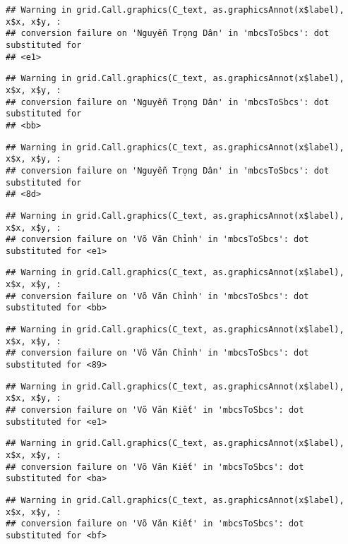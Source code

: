 \documentclass[
]{article}
\begin{document}
\begin{verbatim}
## Warning in grid.Call.graphics(C_text, as.graphicsAnnot(x$label), x$x, x$y, :
## conversion failure on 'Nguyễn Trọng Dân' in 'mbcsToSbcs': dot substituted for
## <e1>
\end{verbatim}

\begin{verbatim}
## Warning in grid.Call.graphics(C_text, as.graphicsAnnot(x$label), x$x, x$y, :
## conversion failure on 'Nguyễn Trọng Dân' in 'mbcsToSbcs': dot substituted for
## <bb>
\end{verbatim}

\begin{verbatim}
## Warning in grid.Call.graphics(C_text, as.graphicsAnnot(x$label), x$x, x$y, :
## conversion failure on 'Nguyễn Trọng Dân' in 'mbcsToSbcs': dot substituted for
## <8d>
\end{verbatim}

\begin{verbatim}
## Warning in grid.Call.graphics(C_text, as.graphicsAnnot(x$label), x$x, x$y, :
## conversion failure on 'Võ Văn Chỉnh' in 'mbcsToSbcs': dot substituted for <e1>
\end{verbatim}

\begin{verbatim}
## Warning in grid.Call.graphics(C_text, as.graphicsAnnot(x$label), x$x, x$y, :
## conversion failure on 'Võ Văn Chỉnh' in 'mbcsToSbcs': dot substituted for <bb>
\end{verbatim}

\begin{verbatim}
## Warning in grid.Call.graphics(C_text, as.graphicsAnnot(x$label), x$x, x$y, :
## conversion failure on 'Võ Văn Chỉnh' in 'mbcsToSbcs': dot substituted for <89>
\end{verbatim}

\begin{verbatim}
## Warning in grid.Call.graphics(C_text, as.graphicsAnnot(x$label), x$x, x$y, :
## conversion failure on 'Võ Văn Kiết' in 'mbcsToSbcs': dot substituted for <e1>
\end{verbatim}

\begin{verbatim}
## Warning in grid.Call.graphics(C_text, as.graphicsAnnot(x$label), x$x, x$y, :
## conversion failure on 'Võ Văn Kiết' in 'mbcsToSbcs': dot substituted for <ba>
\end{verbatim}

\begin{verbatim}
## Warning in grid.Call.graphics(C_text, as.graphicsAnnot(x$label), x$x, x$y, :
## conversion failure on 'Võ Văn Kiết' in 'mbcsToSbcs': dot substituted for <bf>
\end{verbatim}
\end{document}
